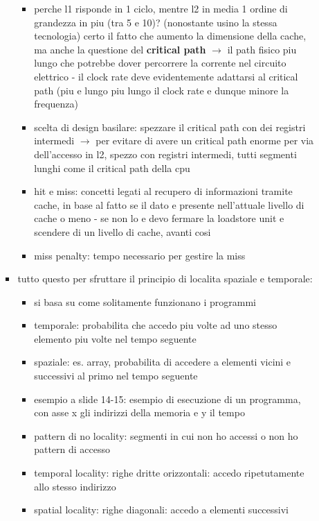 \begin{itemize}
\begin{itemize}
\begin{itemize}
\begin{itemize}
              \item perche l1 risponde in 1 ciclo, mentre l2 in media 1 ordine di grandezza in piu (tra 5 e 10)? (nonostante usino la stessa tecnologia) certo il fatto che aumento la dimensione della cache, ma anche la questione del \textbf{critical path} $\rightarrow$ il path fisico piu lungo che potrebbe dover percorrere la corrente nel circuito elettrico - il clock rate deve evidentemente adattarsi al critical path (piu e lungo piu lungo il clock rate e dunque minore la frequenza)
              \item scelta di design basilare: spezzare il critical path con dei registri intermedi $\rightarrow$ per evitare di avere un critical path enorme per via dell'accesso in l2, spezzo con registri intermedi, tutti segmenti lunghi come il critical path della cpu
              \item hit e miss: concetti legati al recupero di informazioni tramite cache, in base al fatto se il dato e presente nell'attuale livello di cache o meno - se non lo e devo fermare la loadstore unit e scendere di un livello di cache, avanti cosi
              \item miss penalty: tempo necessario per gestire la miss

            \end{itemize}

          \item tutto questo per sfruttare il principio di localita spaziale e temporale:
            \begin{itemize}
              \item si basa su come solitamente funzionano i programmi
              \item temporale: probabilita che accedo piu volte ad uno stesso elemento piu volte nel tempo seguente
              \item spaziale: es. array, probabilita di accedere a elementi vicini e successivi al primo nel tempo seguente
              \item esempio a slide 14-15: esempio di esecuzione di un programma, con asse x gli indirizzi della memoria e y il tempo
                  \item pattern di no locality: segmenti in cui non ho accessi o non ho pattern di accesso
                  \item temporal locality: righe dritte orizzontali: accedo ripetutamente allo stesso indirizzo
                  \item spatial locality: righe diagonali: accedo a elementi successivi
            \end{itemize}


\end{itemize}
\end{itemize}
\end{itemize}
